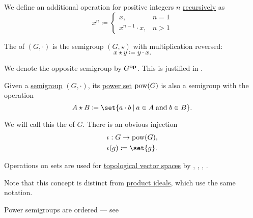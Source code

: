 \begin{definition}
\begin{thmenum}[series=def:semigroup]
     We define an additional  operation for positive integers \( n \) \hyperref[rem:natural_number_recursion]{recursively} as
    \begin{equation}\label{eq:def:semigroup/exponentiation}
      x^n \coloneqq \begin{cases}
        x,               &n = 1 \\
        x^{n-1} \cdot x, &n > 1
      \end{cases}
    \end{equation}

    \mimprovised The  of \( (G, \cdot) \) is the semigroup \( (G, \star) \) with multiplication reversed:
    \begin{equation*}
      x \star y \coloneqq y \cdot x.
    \end{equation*}

    We denote the opposite semigroup by \( G^\oppos \). This is justified in .
  \end{thmenum}
\end{definition}

\begin{definition}\label{def:power_semigroup}
  Given a \hyperref[def:semigroup]{semigroup} \( (G, \cdot) \), its \hyperref[def:basic_set_operations/power_set]{power set} \( \operatorname{pow}(G) \) is also a semigroup with the operation
  \begin{equation*}
    A \star B \coloneqq \set{ a \cdot b \given a \in A \T{and} b \in B }.
  \end{equation*}

  We will call this the  of \( G \). There is an obvious injection
  \begin{equation*}
    \begin{aligned}
      &\iota: G \to \pow(G), \\
      &\iota(g) \coloneqq \set{ g }.
    \end{aligned}
  \end{equation*}
\end{definition}
\begin{comments}
  \item Operations on sets are used for \hyperref[def:topological_vector_space]{topological vector spaces} by , , , .

  \item Note that this concept is distinct from \hyperref[def:semiring_ideal/product]{product ideals}, which use the same notation.

  \item Power semigroups are ordered --- see 
\end{comments}

